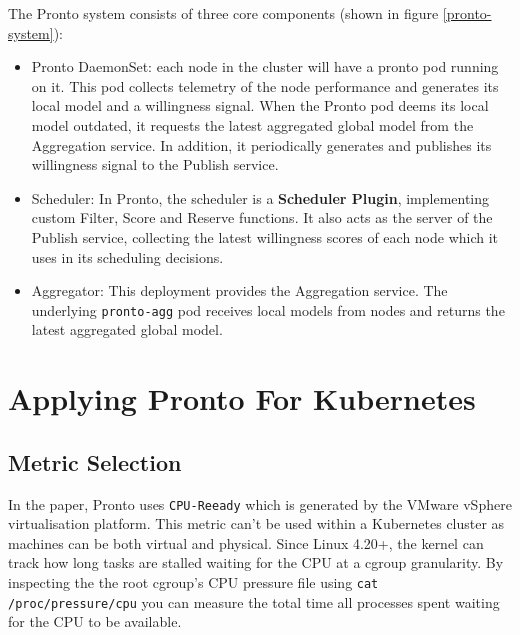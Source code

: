 The Pronto system consists of three core components (shown in figure
\ref{pronto-system}):
\begin{itemize}
    \item Pronto DaemonSet: each node in the cluster will have a pronto pod
        running on it. This pod collects telemetry of the node performance and
        generates its local model and a willingness signal. When the Pronto pod
        deems its local model outdated, it requests the latest aggregated global
        model from the Aggregation service. In addition, it periodically
        generates and publishes its willingness signal to the Publish service.
    \item Scheduler: In Pronto, the scheduler is a \textbf{Scheduler Plugin}, implementing custom
        Filter, Score and Reserve functions. It also acts as the server of the
        Publish service, collecting the latest willingness scores of each node
        which it uses in its scheduling decisions.
    \item Aggregator: This deployment provides the Aggregation service. The
        underlying \verb|pronto-agg| pod receives local models from nodes and
        returns the latest aggregated global model.
\end{itemize}

\section{Applying Pronto For Kubernetes}

\subsection{Metric Selection}
In the paper, Pronto uses \verb|CPU-Reeady| which is generated by the VMware
vSphere virtualisation platform. This metric can't be used within a
Kubernetes cluster as machines can be both virtual and physical. Since Linux
4.20+, the kernel can track how long tasks are stalled waiting for the CPU
at a cgroup granularity. By inspecting the the root cgroup’s CPU pressure
file using \verb|cat /proc/pressure/cpu| you can measure the total time all
processes spent waiting for the CPU to be available.

